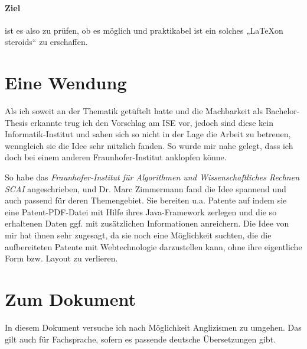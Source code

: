 \paragraph{Ziel} ist es also zu prüfen, ob es möglich und praktikabel ist
ein solches „\LaTeX on steroids“ zu erschaffen.

\section{Eine Wendung}

Als ich soweit an der Thematik getüftelt hatte und die Machbarkeit als
Bachelor-Thesis erkannte trug ich den Vorschlag am ISE vor, jedoch sind
diese kein Informatik-Institut und sahen sich so nicht in der Lage die Arbeit
zu betreuen, wenngleich sie die Idee sehr nützlich fanden. So wurde mir
nahe gelegt, dass ich doch bei einem anderen Fraunhofer-Institut anklopfen
könne.

So habe das \emph{Fraunhofer-Institut für Algorithmen und Wissenschaftliches
Rechnen SCAI} angeschrieben, und Dr. Marc Zimmermann fand
die Idee spannend und auch passend für deren Themengebiet. Sie bereiten u.a.
Patente auf indem sie eine Patent-PDF-Datei mit Hilfe ihres Java-Framework
zerlegen und die so erhaltenen Daten ggf. mit zusätzlichen Informationen
anreichern. Die Idee von mir hat ihnen sehr zugesagt, da sie noch eine
Möglichkeit suchten, die die aufbereiteten Patente mit Webtechnologie
darzustellen kann, ohne ihre eigentliche Form bzw. Layout zu verlieren.

\section{Zum Dokument}

In diesem Dokument versuche ich nach Möglichkeit Anglizismen zu umgehen.
Das gilt auch für Fachsprache, sofern es passende deutsche Übersetzungen gibt.



